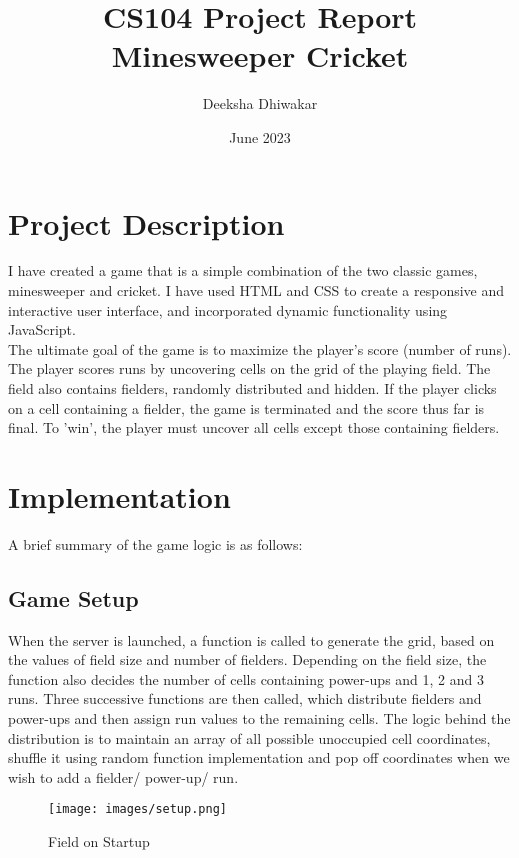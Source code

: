 \documentclass{article}
\begin{document}
\title{CS104 Project Report \\ Minesweeper Cricket}
\author{Deeksha Dhiwakar}
\date{June 2023}
\maketitle
\tableofcontents
\clearpage

\pagestyle{fancy}

\section{Project Description}
I have created a game that is a simple combination of the two classic games, minesweeper and cricket. I have used HTML and CSS to create a responsive and interactive user interface, and incorporated dynamic functionality using JavaScript. \\
The ultimate goal of the game is to maximize the player's score (number of runs). The player scores runs by uncovering cells on the grid of the playing field. The field also contains fielders, randomly distributed and hidden. If the player clicks on a cell containing a fielder, the game is terminated and the score thus far is final. To 'win', the player must uncover all cells except those containing fielders.

\section{Implementation}
A brief summary of the game logic is as follows:
\subsection{Game Setup}
When the server is launched, a function is called to generate the grid, based on the values of field size and number of fielders. Depending on the field size, the function also decides the number of cells containing power-ups and 1, 2 and 3 runs. Three successive functions are then called, which distribute fielders and power-ups and then assign run values to the remaining cells. The logic behind the distribution is to maintain an array of all possible unoccupied cell coordinates, shuffle it using random function implementation and pop off coordinates when we wish to add a fielder/ power-up/ run. \\

\begin{figure}[h!]
    \centering
    \texttt{[image: images/setup.png]}
    \caption{Field on Startup}
    \label{fig:enter-label}
\end{figure}
\end{document}
